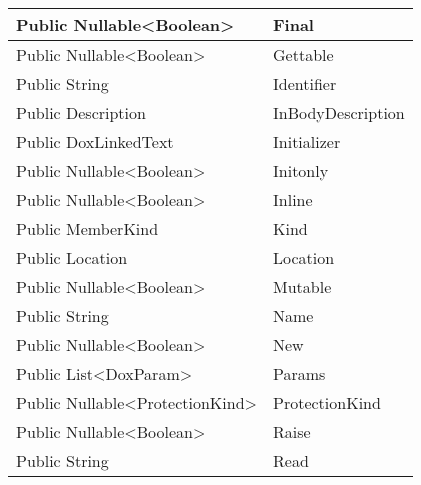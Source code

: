 \documentclass[11pt, oneside, a4paper]{book}
\begin{document}
\begin{center}
\begin{tabular}{| p{3cm} | p{12cm} | }
 Public  Nullable<Boolean> &  Final\hypertarget{SoftwareEngineeringTools.{}Documentation.{}MemberEnum.{}Final}{}\\
\hline
 Public  Nullable<Boolean> &  Gettable\hypertarget{SoftwareEngineeringTools.{}Documentation.{}MemberEnum.{}Gettable}{}\\
\hline
 Public  String &  Identifier\hypertarget{SoftwareEngineeringTools.{}Documentation.{}MemberEnum.{}Identifier}{}\\
\hline
 Public  Description &  InBodyDescription\hypertarget{SoftwareEngineeringTools.{}Documentation.{}MemberEnum.{}InBodyDescription}{}\\
\hline
 Public  DoxLinkedText &  Initializer\hypertarget{SoftwareEngineeringTools.{}Documentation.{}MemberEnum.{}Initializer}{}\\
\hline
 Public  Nullable<Boolean> &  Initonly\hypertarget{SoftwareEngineeringTools.{}Documentation.{}MemberEnum.{}Initonly}{}\\
\hline
 Public  Nullable<Boolean> &  Inline\hypertarget{SoftwareEngineeringTools.{}Documentation.{}MemberEnum.{}Inline}{}\\
\hline
 Public  MemberKind &  Kind\hypertarget{SoftwareEngineeringTools.{}Documentation.{}MemberEnum.{}Kind}{}\\
\hline
 Public  Location &  Location\hypertarget{SoftwareEngineeringTools.{}Documentation.{}MemberEnum.{}Location}{}\\
\hline
 Public  Nullable<Boolean> &  Mutable\hypertarget{SoftwareEngineeringTools.{}Documentation.{}MemberEnum.{}Mutable}{}\\
\hline
 Public  String &  Name\hypertarget{SoftwareEngineeringTools.{}Documentation.{}MemberEnum.{}Name}{}\\
\hline
 Public  Nullable<Boolean> &  New\hypertarget{SoftwareEngineeringTools.{}Documentation.{}MemberEnum.{}New}{}\\
\hline
 Public  List<DoxParam> &  Params\hypertarget{SoftwareEngineeringTools.{}Documentation.{}MemberEnum.{}Params}{}\\
\hline
 Public  Nullable<ProtectionKind> &  ProtectionKind\hypertarget{SoftwareEngineeringTools.{}Documentation.{}MemberEnum.{}ProtectionKind}{}\\
\hline
 Public  Nullable<Boolean> &  Raise\hypertarget{SoftwareEngineeringTools.{}Documentation.{}MemberEnum.{}Raise}{}\\
\hline
 Public  String &  Read\hypertarget{SoftwareEngineeringTools.{}Documentation.{}MemberEnum.{}Read}{}\\

\end{tabular}
\end{center}
\end{document}
